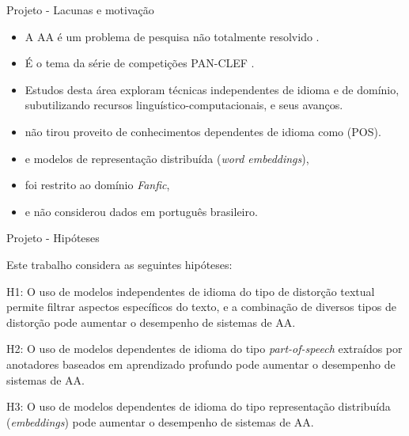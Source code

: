 \begin{frame}{Projeto - Lacunas e motivação}
	\begin{tcolorbox}[colback=blue!5!white,colframe=blue!50!black,valign=center,title=Lacunas gerais:]\selectFont
		\begin{itemize}
			\item A AA é um problema de pesquisa não totalmente resolvido \cite{Potthast2017}.
			\item É o tema da série de competições PAN-CLEF \cite{aa-overview-2018}.
			\item Estudos desta área exploram técnicas independentes de idioma e de domínio, subutilizando  recursos linguístico-computacionais, e seus avanços.
		\end{itemize}
	\end{tcolorbox}

	\begin{tcolorbox}[colback=blue!5!white,colframe=blue!50!black,valign=center,title=\citeonline{custodioParaboni2018} obteve o melhor desempenho global na PAN-CLEF2018 mas  deixa as seguintes lacunas:
		]\selectFont
		\begin{itemize}
			\item não tirou proveito de conhecimentos dependentes de idioma como (POS).
			\item e modelos de representação distribuída ({\it word embeddings}),
			\item foi restrito ao domínio {\it Fanfic},
			\item e não considerou dados em português brasileiro.
		\end{itemize}
	\end{tcolorbox}	
	

\end{frame}

\begin{frame} {Projeto - Hipóteses}

	Este trabalho considera as seguintes hipóteses:
	
	\begin{block}{H1:} O uso de modelos independentes de idioma do tipo de distorção textual permite filtrar aspectos específicos do texto, e a combinação de diversos tipos de distorção pode aumentar o desempenho de sistemas de AA.
	\end{block}
	
	\begin{block}{H2:} O uso de modelos dependentes de idioma do tipo {\it part-of-speech} extraídos por anotadores baseados em aprendizado profundo pode aumentar o desempenho de sistemas de AA.
	\end{block}
	
	
	\begin{block}{H3:} O uso de modelos dependentes de idioma do tipo representação distribuída ({\it embeddings}) pode aumentar o desempenho de sistemas de AA.
	\end{block}

\end{frame}

